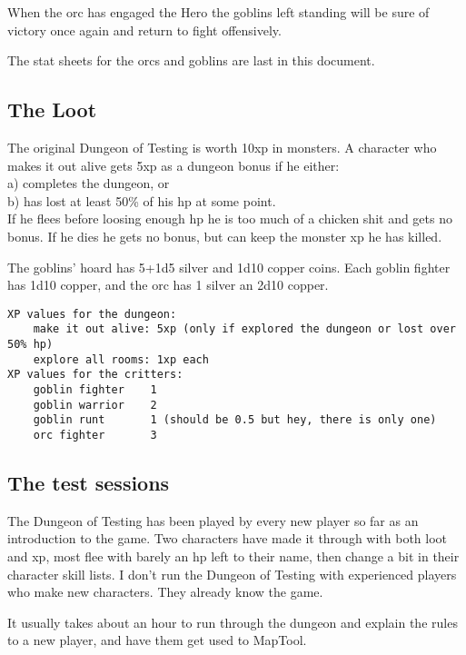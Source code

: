 When the orc has engaged the Hero the goblins left standing will be sure of victory once again and return to fight offensively.

The stat sheets for the orcs and goblins are last in this document.


\subsection*{The Loot}

The original Dungeon of Testing is worth 10xp in monsters. A character who makes it out alive gets 5xp as a dungeon bonus if he either: \\
a) completes the dungeon, or \\
b) has lost at least 50\% of his hp at some point. \\
If he flees before loosing enough hp he is too much of a chicken shit and gets no bonus. If he dies he gets no bonus, but can keep the monster xp he has killed.

The goblins' hoard has 5+1d5 silver and 1d10 copper coins.
Each goblin fighter has 1d10 copper, and the orc has 1 silver an 2d10 copper.

\small \begin{verbatim}
XP values for the dungeon:
    make it out alive: 5xp (only if explored the dungeon or lost over 50% hp)
    explore all rooms: 1xp each
XP values for the critters:
    goblin fighter    1
    goblin warrior    2
    goblin runt       1 (should be 0.5 but hey, there is only one)
    orc fighter       3
\end{verbatim} \normalsize




\subsection*{The test sessions}

The Dungeon of Testing has been played by every new player so far as an introduction to the game. Two characters have made it through with both loot and xp, most flee with barely an hp left to their name, then change a bit in their character skill lists. I don't run the Dungeon of Testing with experienced players who make new characters. They already know the game.

It usually takes about an hour to run through the dungeon and explain the rules to a new player, and have them get used to MapTool. 






